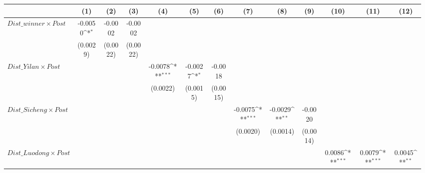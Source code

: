 {
\def\sym#1{\ifmmode^{#1}\else\(^{#1}\)\fi}
\begin{tabular}{l*{12}{c}}
\toprule
                &\multicolumn{1}{c}{(1)}         &\multicolumn{1}{c}{(2)}         &\multicolumn{1}{c}{(3)}         &\multicolumn{1}{c}{(4)}         &\multicolumn{1}{c}{(5)}         &\multicolumn{1}{c}{(6)}         &\multicolumn{1}{c}{(7)}         &\multicolumn{1}{c}{(8)}         &\multicolumn{1}{c}{(9)}         &\multicolumn{1}{c}{(10)}         &\multicolumn{1}{c}{(11)}         &\multicolumn{1}{c}{(12)}         \\
\midrule
$ Dist\_winner \times Post$&  -0.0050\sym{*}  &  -0.0002         &  -0.0002         &                  &                  &                  &                  &                  &                  &                  &                  &                  \\
                & (0.0029)         & (0.0022)         & (0.0022)         &                  &                  &                  &                  &                  &                  &                  &                  &                  \\
\addlinespace
$ Dist\_Yilan \times Post$&                  &                  &                  &  -0.0078\sym{***}&  -0.0027\sym{*}  &  -0.0018         &                  &                  &                  &                  &                  &                  \\
                &                  &                  &                  & (0.0022)         & (0.0015)         & (0.0015)         &                  &                  &                  &                  &                  &                  \\
\addlinespace
$ Dist\_Sicheng \times Post$&                  &                  &                  &                  &                  &                  &  -0.0075\sym{***}&  -0.0029\sym{**} &  -0.0020         &                  &                  &                  \\
                &                  &                  &                  &                  &                  &                  & (0.0020)         & (0.0014)         & (0.0014)         &                  &                  &                  \\
\addlinespace
$ Dist\_Luodong \times Post$&                  &                  &                  &                  &                  &                  &                  &                  &                  &   0.0086\sym{***}&   0.0079\sym{***}&   0.0045\sym{**} \\

\end{tabular}}
